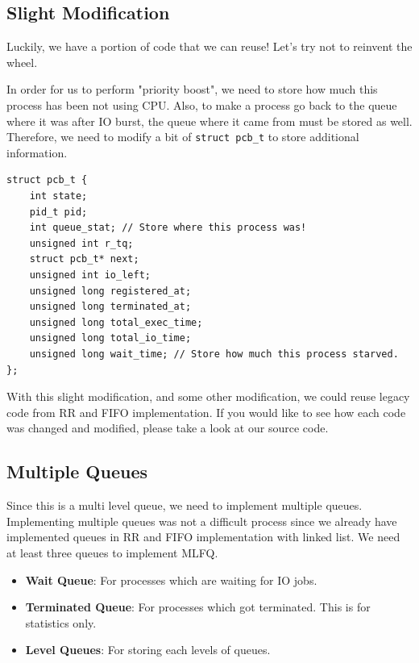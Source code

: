 \documentclass{homework}
\begin{document}
\subsection{Slight Modification}
Luckily, we have a portion of code that we can reuse! Let's try not to reinvent the wheel.

In order for us to perform "priority boost", we need to store how much this process has been not using CPU. Also, to make a process go back to the queue where it was after IO burst, the queue where it came from must be stored as well. Therefore, we need to modify a bit of \texttt{struct pcb_t} to store additional information.
\\
\begin{center}
\begin{code}
\begin{verbatim}
struct pcb_t {
    int state; 
    pid_t pid; 
    int queue_stat; // Store where this process was!
    unsigned int r_tq;
    struct pcb_t* next; 
    unsigned int io_left; 
    unsigned long registered_at;
    unsigned long terminated_at; 
    unsigned long total_exec_time; 
    unsigned long total_io_time;
    unsigned long wait_time; // Store how much this process starved.
};
\end{verbatim}
\end{code}
\end{center}

With this slight modification, and some other modification, we could reuse legacy code from RR and FIFO implementation. If you would like to see how each code was changed and modified, please take a look at our source code. 

\subsection{Multiple Queues}
Since this is a multi level queue, we need to implement multiple queues. Implementing multiple queues was not a difficult process since we already have implemented queues in RR and FIFO implementation with linked list. We need at least three queues to implement MLFQ.
\begin{itemize}
    \item \textbf{Wait Queue}: For processes which are waiting for IO jobs.
    \item \textbf{Terminated Queue}: For processes which got terminated. This is for statistics only.
    \item \textbf{Level Queues}: For storing each levels of queues.
\end{itemize}
\end{document}

